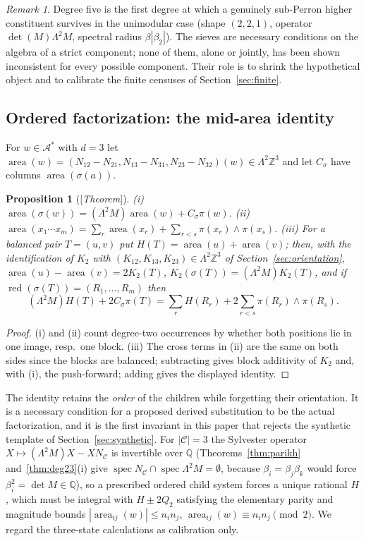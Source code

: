 \documentclass[11pt]{amsart}
\theoremstyle{plain}
\newtheorem{proposition}[theorem]{Proposition}
\theoremstyle{definition}
\theoremstyle{remark}
\newtheorem{remark}[theorem]{Remark}
\newcommand{\Z}{\mathbb{Z}}
\newcommand{\Q}{\mathbb{Q}}
\newcommand{\A}{\mathcal{A}}
\newcommand{\cC}{\mathcal{C}}
\newcommand{\spec}{\operatorname{spec}}
\newcommand{\red}{\operatorname{red}}
\newcommand{\area}{\operatorname{area}}
\newcommand{\Status}[1]{\textup{[\textit{#1}]}}
\begin{document}
\begin{remark}
Degree five is the first degree at which a genuinely sub-Perron higher constituent survives in the unimodular case (shape $(2,2,1)$, operator $\det(M)\Lambda^2M$, spectral radius $\beta|\beta_2|$). The sieves are necessary conditions on the algebra of a strict component; none of them, alone or jointly, has been shown inconsistent for every possible component. Their role is to shrink the hypothetical object and to calibrate the finite censuses of Section~\ref{sec:finite}.
\end{remark}

\subsection{Ordered factorization: the mid-area identity}\label{sec:midarea}

For $w\in\A^*$ with $d=3$ let $\area(w)=(N_{12}-N_{21},N_{13}-N_{31},N_{23}-N_{32})(w)\in\Lambda^2\Z^3$ and let $C_\sigma$ have columns $\area(\sigma(a))$.

\begin{proposition}[\Status{Theorem}]\label{prop:midarea}
(i) $\area(\sigma(w))=(\Lambda^2M)\area(w)+C_\sigma\pi(w)$. (ii) $\area(x_1\cdots x_m)=\sum_r\area(x_r)+\sum_{r<s}\pi(x_r)\wedge\pi(x_s)$. (iii) For a balanced pair $T=(u,v)$ put $H(T)=\area(u)+\area(v)$; then, with the identification of $K_2$ with $(K_{12},K_{13},K_{23})\in\Lambda^2\Z^3$ of Section~\ref{sec:orientation}, $\area(u)-\area(v)=2K_2(T)$, $K_2(\sigma(T))=(\Lambda^2M)K_2(T)$, and if $\red(\sigma(T))=(R_1,\dots,R_m)$ then
\[
(\Lambda^2M)H(T)+2C_\sigma\pi(T)=\sum_rH(R_r)+2\sum_{r<s}\pi(R_r)\wedge\pi(R_s).
\]
\end{proposition}
\begin{proof}
(i) and (ii) count degree-two occurrences by whether both positions lie in one image, resp.\ one block. (iii) The cross terms in (ii) are the same on both sides since the blocks are balanced; subtracting gives block additivity of $K_2$ and, with (i), the push-forward; adding gives the displayed identity.
\end{proof}

The identity retains the \emph{order} of the children while forgetting their orientation. It is a necessary condition for a proposed derived substitution to be the actual factorization, and it is the first invariant in this paper that rejects the synthetic template of Section~\ref{sec:synthetic}. For $|\cC|=3$ the Sylvester operator $X\mapsto(\Lambda^2M)X-XN_\cC$ is invertible over $\Q$ (Theorems~\ref{thm:parikh} and~\ref{thm:deg23}(i) give $\spec N_\cC\cap\spec\Lambda^2M=\emptyset$, because $\beta_i=\beta_j\beta_k$ would force $\beta_i^2=\det M\in\Q$), so a prescribed ordered child system forces a unique rational $H$, which must be integral with $H\pm 2Q_2$ satisfying the elementary parity and magnitude bounds $|\area_{ij}(w)|\le n_in_j$, $\area_{ij}(w)\equiv n_in_j\pmod2$. We regard the three-state calculations as calibration only.
\end{document}
